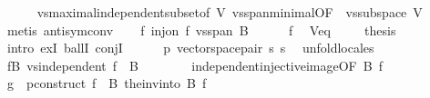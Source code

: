 \begin{isabellebody}
\ \ \ \ \isamarkupfalse%
\ vs{}{\isachardot}{\kern0pt}maximal{\isacharunderscore}{\kern0pt}independent{\isacharunderscore}{\kern0pt}subset{\isacharbrackleft}{\kern0pt}of\ V{\isacharbrackright}{\kern0pt}\ vs{}{\isachardot}{\kern0pt}span{\isacharunderscore}{\kern0pt}minimal{\isacharbrackleft}{\kern0pt}OF\ {\isacharunderscore}{\kern0pt}\ {\isacartoucheopen}vs{}{\isachardot}{\kern0pt}subspace\ V{\isacartoucheclose}{\isacharbrackright}{\kern0pt}\isanewline
\ \ \ \ \isamarkupfalse%
\ {\isacharparenleft}{\kern0pt}metis\ antisym{\isacharunderscore}{\kern0pt}conv{\isacharparenright}{\kern0pt}\isanewline
\ \ \isamarkupfalse%
\ f{\isacharcolon}{\kern0pt}\ {\isachardoublequoteopen}inj{\isacharunderscore}{\kern0pt}on\ f\ {\isacharparenleft}{\kern0pt}vs{}{\isachardot}{\kern0pt}span\ B{\isacharparenright}{\kern0pt}{\isachardoublequoteclose}\isanewline
\ \ \ \ \isamarkupfalse%
\ f\ \isamarkupfalse%
\ V{\isacharunderscore}{\kern0pt}eq\ \isacommand{{\isachardot}{\kern0pt}}\isamarkupfalse%
\isanewline
\ \ \isamarkupfalse%
\ {\isacharquery}{\kern0pt}thesis\isanewline
\ \ \isamarkupfalse%
\ {\isacharparenleft}{\kern0pt}intro\ exI\ ballI\ conjI{\isacharparenright}{\kern0pt}\isanewline
\ \ \ \ \isamarkupfalse%
\ p{\isacharcolon}{\kern0pt}\ vector{\isacharunderscore}{\kern0pt}space{\isacharunderscore}{\kern0pt}pair\ s{}\ s{}\ \isamarkupfalse%
\ unfold{\isacharunderscore}{\kern0pt}locales\isanewline
\ \ \ \ \isamarkupfalse%
\ fB{\isacharcolon}{\kern0pt}\ {\isachardoublequoteopen}vs{}{\isachardot}{\kern0pt}independent\ {\isacharparenleft}{\kern0pt}f\ {\isacharbackquote}{\kern0pt}\ B{\isacharparenright}{\kern0pt}{\isachardoublequoteclose}\isanewline
\ \ \ \ \ \ \isamarkupfalse%
\ independent{\isacharunderscore}{\kern0pt}injective{\isacharunderscore}{\kern0pt}image{\isacharbrackleft}{\kern0pt}OF\ B\ f{\isacharbrackright}{\kern0pt}\ \isacommand{{\isachardot}{\kern0pt}}\isamarkupfalse%
\isanewline
\ \ \ \ \isamarkupfalse%
\ {\isacharquery}{\kern0pt}g\ {\isacharequal}{\kern0pt}\ {\isachardoublequoteopen}p{\isachardot}{\kern0pt}construct\ {\isacharparenleft}{\kern0pt}f\ {\isacharbackquote}{\kern0pt}\ B{\isacharparenright}{\kern0pt}\ {\isacharparenleft}{\kern0pt}the{\isacharunderscore}{\kern0pt}inv{\isacharunderscore}{\kern0pt}into\ B\ f{\isacharparenright}{\kern0pt}{\isachardoublequoteclose}\isanewline

\end{isabellebody}

